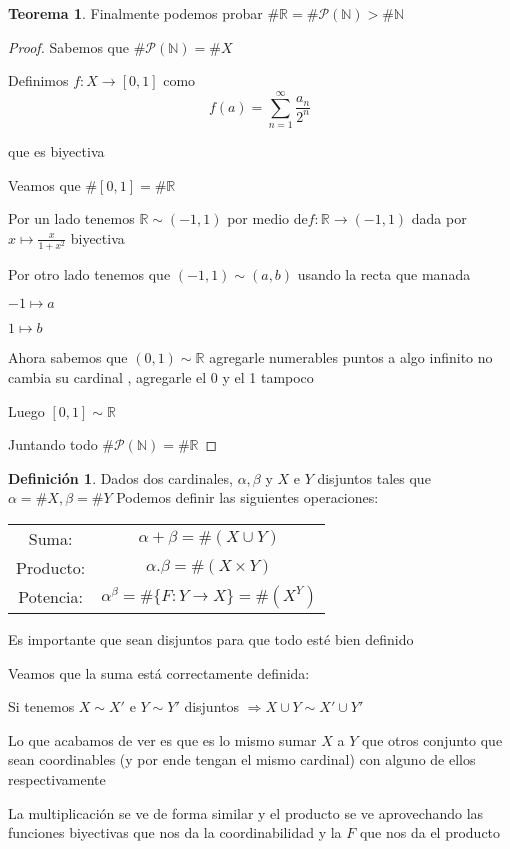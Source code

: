 \documentclass[12pt]{article}
\newcommand{\R}{\mathbb{R}}
\newcommand{\N}{\mathbb{N}}
\newcommand{\Ra}{\Rightarrow}
\newcommand{\ra}{\rightarrow}
\theoremstyle{definition}
\newtheorem{definition}{Definición}[section]
\newtheorem{theorem}{Teorema}
\begin{document}
\begin{theorem}
  Finalmente podemos probar $\# \R = \# \mathcal{P}(\N) > \# \N$

  \begin{proof}
    Sabemos que $\# \mathcal{P}(\N) = \# X $

    Definimos $f: X \ra [0,1]$ como $$f(a) = \sum_{n = 1}^{\infty} \frac{a_{n}}{2^n}$$

que es biyectiva

Veamos que $\# [0,1] = \# \R$ 

Por un lado tenemos $\R \sim (-1,1)$ por medio de$f:\R \ra (-1,1)$ dada por $x \mapsto \frac{x}{1 + x^2}$ biyectiva

Por otro lado tenemos que $(-1,1) \sim (a,b)$ usando la recta que manada 

$-1 \mapsto a$ 

$1 \mapsto b$

Ahora sabemos que $(0,1) \sim \R$ agregarle numerables puntos a algo infinito no cambia su cardinal , agregarle el 0 y el 1 tampoco 

Luego $[0,1] \sim \R$

Juntando todo $\# \mathcal{P}(\N) = \# \R$
  \end{proof}
\end{theorem}


\begin{definition}
  Dados dos cardinales, $\alpha, \beta$ y $X$ e $Y$ disjuntos tales que $\alpha = \# X, \beta = \# Y$ 
Podemos definir las siguientes operaciones:

\begin{center}
\begin{tabular}{ c c  }
  Suma: & $\alpha + \beta = \# (X \cup Y)$  \\ 
  Producto: & $\alpha . \beta = \# (X \times Y)$  \\  
  Potencia: & $\alpha^{\beta} = \# \{F: Y \ra X\} = \#(X^Y)$     
\end{tabular}
\end{center}


Es importante que sean disjuntos para que todo esté bien definido

Veamos que la suma está correctamente definida:

Si tenemos $X \sim X'$ e $Y \sim Y'$ disjuntos $\Ra X \cup Y \sim X' \cup Y'$ 

Lo que acabamos de ver es que es lo mismo sumar $X$ a $Y$ que otros conjunto que sean coordinables (y por ende tengan el mismo cardinal) con alguno de ellos respectivamente

La multiplicación se ve de forma similar y el producto se ve aprovechando las funciones biyectivas que nos da la coordinabilidad y la $F$ que nos da el producto
\end{definition}
\end{document}
